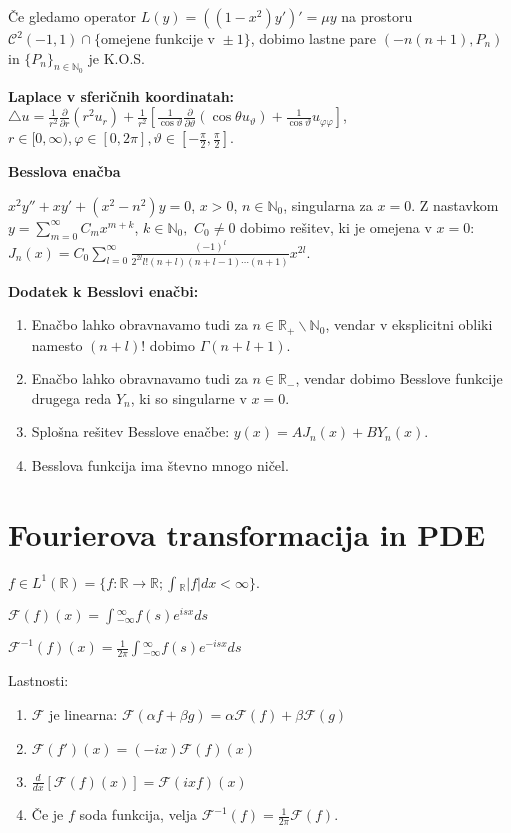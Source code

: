 \documentclass[10pt,a4paper]{amsart}
\theoremstyle{definition} %
\theoremstyle{plain} %
\let\oldint\int
\renewcommand{\int}{\oldint \!}
\newcommand{\R}{\mathbb R}
\newcommand{\N}{\mathbb N}
\newcommand{\F}{\mathcal{F}}
\begin{document}
Če gledamo operator $L(y) = ((1-x^2)y')'=\mu y$ na prostoru $\mathcal{C}^2(-1,1) \cap \{\text{omejene funkcije v }\pm1 \}$, dobimo lastne pare $(-n(n+1),P_n)$ in $\{P_n \}_{n \in \N_0}$ je K.O.S.

\textbf{Laplace v sferičnih koordinatah:} $\triangle u = \frac{1}{r^2} \frac{\partial}{\partial r}(r^2u_r) + \frac{1}{r^2}\left[ \frac{1}{\cos \vartheta} \frac{\partial}{\partial \vartheta}(\cos \theta u_\vartheta) + \frac{1}{\cos \vartheta} u_{\varphi \varphi} \right]$, $r \in [0,\infty ),\varphi \in [0,2\pi], \vartheta \in [-\frac{\pi}{2}, \frac{\pi}{2}]$.

\textbf{Besslova enačba}

$x^2y''+xy'+(x^2-n^2)y = 0$, $x > 0$, $n \in \N_0$, singularna za $x = 0$. Z nastavkom $y = \sum_{m = 0}^\infty C_m x^{m+k}$, $k \in \N_0,$ $C_0 \neq 0$ dobimo rešitev, ki je omejena v $x = 0$: $J_n(x) = C_0 \sum_{l = 0}^\infty \frac{(-1)^l}{2^{2l}l!(n+l)(n+l-1)\cdots (n+1)}x^{2l}$.

\textbf{Dodatek k Besslovi enačbi:}
\begin{enumerate}
\item Enačbo lahko obravnavamo tudi za $n \in \R_+\backslash \N_0$, vendar v eksplicitni obliki namesto $(n+l)!$ dobimo $\Gamma (n+l+1)$.
\item Enačbo lahko obravnavamo tudi za $n \in \R_-$, vendar dobimo Besslove funkcije drugega reda $Y_n$, ki so singularne v $x=0$.
\item Splošna rešitev Besslove enačbe: $y(x) = AJ_n(x) + BY_n(x)$.
\item Besslova funkcija ima števno mnogo ničel.
\end{enumerate}

\section*{Fourierova transformacija in PDE}

$f \in L^1(\R ) = \{ f: \R \longrightarrow \R ; \int_\R |f| dx < \infty \}$.

$\F (f) (x) = \int_{-\infty}^\infty f(s) e^{isx} ds$

$\F^{-1} (f) (x) = \frac{1}{2\pi} \int_{-\infty}^\infty f(s) e^{-isx} ds$

Lastnosti:
\begin{enumerate}

\item $\F$ je linearna: $\F(\alpha f + \beta g) = \alpha \F(f) + \beta \F (g)$

\item $\F (f')(x) = (-ix) \F(f)(x)$

\item $\frac{d}{dx} \left[ \F (f)(x) \right] = \F(ixf) (x)$

\item Če je $f$ soda funkcija, velja $\F^{-1}(f) = \frac{1}{2\pi}\F(f)$.

\end{enumerate}
\end{document}
